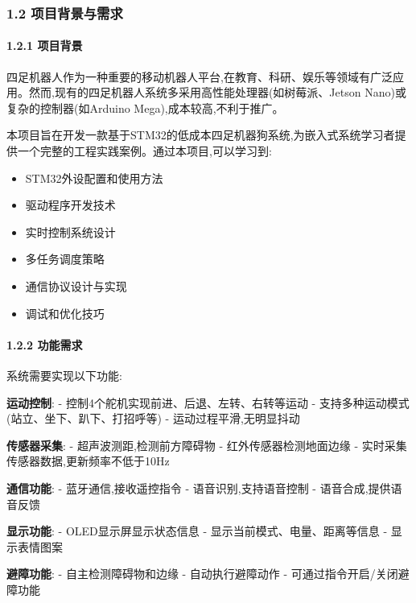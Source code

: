 \documentclass[
]{article}
\providecommand{\tightlist}{%
  \setlength{\itemsep}{0pt}\setlength{\parskip}{0pt}}
\begin{document}
\hypertarget{ux9879ux76eeux80ccux666fux4e0eux9700ux6c42}{%
\subsubsection{1.2
项目背景与需求}\label{ux9879ux76eeux80ccux666fux4e0eux9700ux6c42}}

\hypertarget{ux9879ux76eeux80ccux666f}{%
\paragraph{1.2.1 项目背景}\label{ux9879ux76eeux80ccux666f}}

四足机器人作为一种重要的移动机器人平台,在教育、科研、娱乐等领域有广泛应用。然而,现有的四足机器人系统多采用高性能处理器(如树莓派、Jetson
Nano)或复杂的控制器(如Arduino Mega),成本较高,不利于推广。

本项目旨在开发一款基于STM32的低成本四足机器狗系统,为嵌入式系统学习者提供一个完整的工程实践案例。通过本项目,可以学习到:

\begin{itemize}
\tightlist
\item
  STM32外设配置和使用方法
\item
  驱动程序开发技术
\item
  实时控制系统设计
\item
  多任务调度策略
\item
  通信协议设计与实现
\item
  调试和优化技巧
\end{itemize}

\hypertarget{ux529fux80fdux9700ux6c42}{%
\paragraph{1.2.2 功能需求}\label{ux529fux80fdux9700ux6c42}}

系统需要实现以下功能:

\textbf{运动控制}: - 控制4个舵机实现前进、后退、左转、右转等运动 -
支持多种运动模式(站立、坐下、趴下、打招呼等) - 运动过程平滑,无明显抖动

\textbf{传感器采集}: - 超声波测距,检测前方障碍物 -
红外传感器检测地面边缘 - 实时采集传感器数据,更新频率不低于10Hz

\textbf{通信功能}: - 蓝牙通信,接收遥控指令 - 语音识别,支持语音控制 -
语音合成,提供语音反馈

\textbf{显示功能}: - OLED显示屏显示状态信息 -
显示当前模式、电量、距离等信息 - 显示表情图案

\textbf{避障功能}: - 自主检测障碍物和边缘 - 自动执行避障动作 -
可通过指令开启/关闭避障功能
\end{document}
